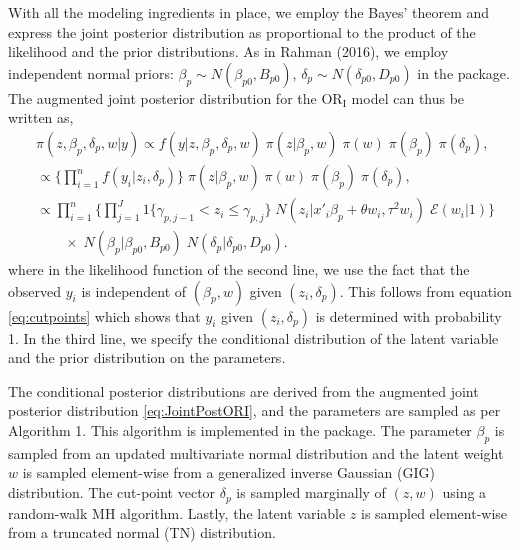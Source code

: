 With all the modeling ingredients in place, we employ the Bayes' theorem and express the joint posterior distribution as proportional to the product of the likelihood and the prior distributions. As in Rahman (2016), we employ independent normal priors: \(\beta_{p} \sim N(\beta_{p0}, B_{p0})\), \(\delta_{p} \sim N(\delta_{p0}, D_{p0})\) in the  package. The augmented joint posterior distribution for the \(\mathrm{OR_{I}}\) model can thus be written as,
\begin{equation} 
\begin{split} 
& \pi(z,\beta_{p}, \delta_{p},w|y)  \propto f(y|z,\beta_{p},\delta_{p},w) \; \pi(z | \beta_{p}, w) \; \pi(w) \; \pi(\beta_{p}) \; \pi(\delta_{p}), \\
   & \propto \Big\{ \prod_{i=1}^{n} f(y_{i}|z_{i},\delta_{p}) \Big\} \; \pi(z | \beta_{p},w) \; \pi(w) \; \pi(\beta_{p}) \; \pi(\delta_{p}), \\
    & \propto  \prod_{i=1}^{n} \bigg\{ \prod_{j=1}^{J} 1\{\gamma_{p,j-1} < z_{i} \le \gamma_{p,j} \} \; N(z_{i}|x'_{i}\beta_{p} + \theta w_{i}, \tau^{2} w_{i}) \; \mathcal{E}(w_{i}|1) \bigg\} \\
    & \qquad \times \; N(\beta_{p}|\beta_{p0}, B_{p0}) \; N(\delta_{p}|\delta_{p0}, D_{p0}).
\end{split}
\label{eq:JointPostORI}
\end{equation}
where in the likelihood function of the second line, we use the fact that the observed \(y_{i}\) is independent of \((\beta_{p},w)\) given \((z_{i},\delta_{p})\). This follows from equation \eqref{eq:cutpoints} which shows that \(y_{i}\) given \((z_{i}, \delta_{p})\) is determined with probability 1. In the third line, we specify the conditional distribution of the latent variable and the prior distribution on the parameters.

The conditional posterior distributions are derived from the augmented joint posterior distribution \eqref{eq:JointPostORI}, and the parameters are sampled as per Algorithm 1. This algorithm is implemented in the  package. The parameter \(\beta_{p}\) is sampled from an updated multivariate normal distribution and the latent weight \(w\) is sampled element-wise from a generalized inverse Gaussian (GIG) distribution. The cut-point vector \(\delta_{p}\) is sampled marginally of \((z, w)\) using a random-walk MH algorithm. Lastly, the latent variable \(z\) is sampled element-wise from a truncated normal (TN) distribution.

\vspace{6pt}

